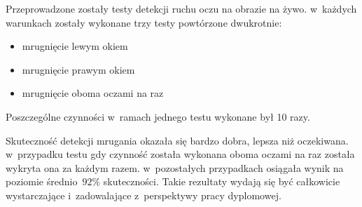 Przeprowadzone zostały testy detekcji ruchu oczu na obrazie na żywo. w~każdych warunkach zostały wykonane trzy testy powtórzone dwukrotnie:

\begin{itemize}
    \item mrugnięcie lewym okiem
    \item mrugnięcie prawym okiem
    \item mrugnięcie oboma oczami na raz
\end{itemize}

Poszczególne czynności w~ramach jednego testu wykonane był 10 razy. 



Skuteczność detekcji mrugania okazała się bardzo dobra, lepsza niż oczekiwana. w~przypadku testu gdy czynność została wykonana oboma oczami na raz została wykryta ona za każdym razem. w~pozostałych przypadkach osiągała wynik na poziomie średnio~$92\%$ skuteczności. Takie rezultaty wydają się być całkowicie wystarczające i~zadowalające z~perspektywy pracy dyplomowej. 